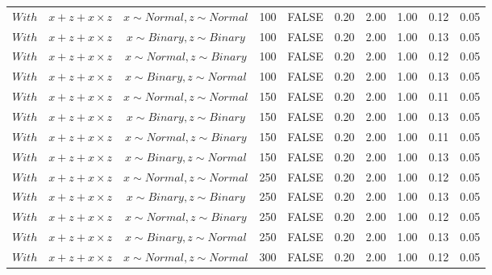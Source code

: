 \begin{longtable}{lccccccccc}
  $With$ & $\textit{x} + \textit{z} + \textit{x} \times \textit{z}$ & $\textit{x} \sim Normal , \textit{z} \sim Normal$ & 100 & FALSE & 0.20 & 2.00 & 1.00 & 0.12 & 0.05 \\ 
  $With$ & $\textit{x} + \textit{z} + \textit{x} \times \textit{z}$ & $\textit{x} \sim Binary, \textit{z} \sim Binary$ & 100 & FALSE & 0.20 & 2.00 & 1.00 & 0.13 & 0.05 \\ 
  $With$ & $\textit{x} + \textit{z} + \textit{x} \times \textit{z}$ & $\textit{x} \sim Normal, \textit{z} \sim Binary$ & 100 & FALSE & 0.20 & 2.00 & 1.00 & 0.12 & 0.05 \\ 
  $With$ & $\textit{x} + \textit{z} + \textit{x} \times \textit{z}$ & $\textit{x} \sim Binary, \textit{z} \sim Normal$ & 100 & FALSE & 0.20 & 2.00 & 1.00 & 0.13 & 0.05 \\ 
  $With$ & $\textit{x} + \textit{z} + \textit{x} \times \textit{z}$ & $\textit{x} \sim Normal , \textit{z} \sim Normal$ & 150 & FALSE & 0.20 & 2.00 & 1.00 & 0.11 & 0.05 \\ 
  $With$ & $\textit{x} + \textit{z} + \textit{x} \times \textit{z}$ & $\textit{x} \sim Binary, \textit{z} \sim Binary$ & 150 & FALSE & 0.20 & 2.00 & 1.00 & 0.13 & 0.05 \\ 
  $With$ & $\textit{x} + \textit{z} + \textit{x} \times \textit{z}$ & $\textit{x} \sim Normal, \textit{z} \sim Binary$ & 150 & FALSE & 0.20 & 2.00 & 1.00 & 0.11 & 0.05 \\ 
  $With$ & $\textit{x} + \textit{z} + \textit{x} \times \textit{z}$ & $\textit{x} \sim Binary, \textit{z} \sim Normal$ & 150 & FALSE & 0.20 & 2.00 & 1.00 & 0.13 & 0.05 \\ 
  $With$ & $\textit{x} + \textit{z} + \textit{x} \times \textit{z}$ & $\textit{x} \sim Normal , \textit{z} \sim Normal$ & 250 & FALSE & 0.20 & 2.00 & 1.00 & 0.12 & 0.05 \\ 
  $With$ & $\textit{x} + \textit{z} + \textit{x} \times \textit{z}$ & $\textit{x} \sim Binary, \textit{z} \sim Binary$ & 250 & FALSE & 0.20 & 2.00 & 1.00 & 0.13 & 0.05 \\ 
  $With$ & $\textit{x} + \textit{z} + \textit{x} \times \textit{z}$ & $\textit{x} \sim Normal, \textit{z} \sim Binary$ & 250 & FALSE & 0.20 & 2.00 & 1.00 & 0.12 & 0.05 \\ 
  $With$ & $\textit{x} + \textit{z} + \textit{x} \times \textit{z}$ & $\textit{x} \sim Binary, \textit{z} \sim Normal$ & 250 & FALSE & 0.20 & 2.00 & 1.00 & 0.13 & 0.05 \\ 
  $With$ & $\textit{x} + \textit{z} + \textit{x} \times \textit{z}$ & $\textit{x} \sim Normal , \textit{z} \sim Normal$ & 300 & FALSE & 0.20 & 2.00 & 1.00 & 0.12 & 0.05 \\ 

\end{longtable}
